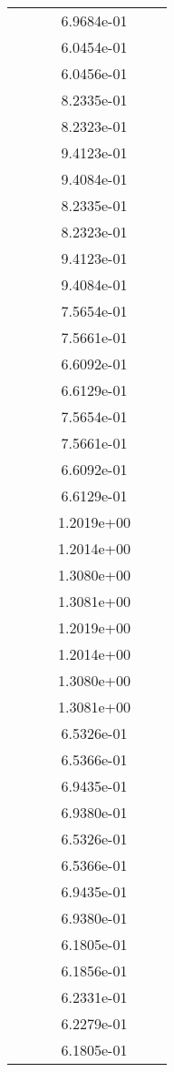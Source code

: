 \begin{xltabular}{\textwidth}{r|rS[table-format=1.3e+2]S[table-format=1.4e+2]S[table-format=1.4e+2]S[table-format=-1.5]}
&  &  & 6.9684e-01 & & \\
&  &  & 6.0454e-01 & & \\
&  &  & 6.0456e-01 & & \\
&  &  & 8.2335e-01 & & \\
&  &  & 8.2323e-01 & & \\
&  &  & 9.4123e-01 & & \\
&  &  & 9.4084e-01 & & \\
&  &  & 8.2335e-01 & & \\
&  &  & 8.2323e-01 & & \\
&  &  & 9.4123e-01 & & \\
&  &  & 9.4084e-01 & & \\
&  &  & 7.5654e-01 & & \\
&  &  & 7.5661e-01 & & \\
&  &  & 6.6092e-01 & & \\
&  &  & 6.6129e-01 & & \\
&  &  & 7.5654e-01 & & \\
&  &  & 7.5661e-01 & & \\
&  &  & 6.6092e-01 & & \\
&  &  & 6.6129e-01 & & \\
&  &  & 1.2019e+00 & & \\
&  &  & 1.2014e+00 & & \\
&  &  & 1.3080e+00 & & \\
&  &  & 1.3081e+00 & & \\
&  &  & 1.2019e+00 & & \\
&  &  & 1.2014e+00 & & \\
&  &  & 1.3080e+00 & & \\
&  &  & 1.3081e+00 & & \\
&  &  & 6.5326e-01 & & \\
&  &  & 6.5366e-01 & & \\
&  &  & 6.9435e-01 & & \\
&  &  & 6.9380e-01 & & \\
&  &  & 6.5326e-01 & & \\
&  &  & 6.5366e-01 & & \\
&  &  & 6.9435e-01 & & \\
&  &  & 6.9380e-01 & & \\
&  &  & 6.1805e-01 & & \\
&  &  & 6.1856e-01 & & \\
&  &  & 6.2331e-01 & & \\
&  &  & 6.2279e-01 & & \\
&  &  & 6.1805e-01 & & \\

\end{xltabular}
